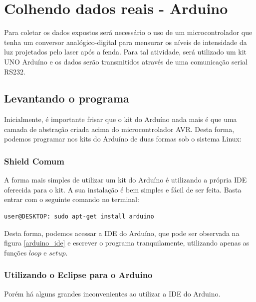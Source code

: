 \section{Colhendo dados reais - Arduino}\label{arduino}

Para coletar os dados expostos será necessário o uso de um microcontrolador que tenha um conversor analógico-digital para mensurar os níveis de intensidade da luz projetados pelo laser após a fenda. Para tal atividade, será utilizado um kit UNO Arduíno e os dados serão transmitidos através de uma comunicação serial RS232.


\subsection{Levantando o programa}\label{program_arduino}

Inicialmente, é importante frisar que o kit do Arduíno nada mais é que uma camada de abstração criada acima do microcontrolador AVR. Desta forma, podemos programar nos kits do Arduíno de duas formas sob o sistema Linux:

\subsubsection{Shield Comum}\label{noob}

A forma mais simples de utilizar um kit do Arduíno é utilizando a própria IDE oferecida para o kit. A sua instalação é bem simples e fácil de ser feita. Basta entrar com o seguinte comando no terminal:


\begin{lstlisting}[style=Bash,numbers=none]
user@DESKTOP: sudo apt-get install arduino
\end{lstlisting}

Desta forma, podemos acessar a IDE do Arduíno, que pode ser observada na figura \ref{arduino_ide} e escrever o programa tranquilamente, utilizando apenas as funções $loop$ e $setup$.

\subsubsection{Utilizando o Eclipse para o Arduino}\label{eclipse}

Porém há alguns grandes inconvenientes ao utilizar a IDE do Arduino.

